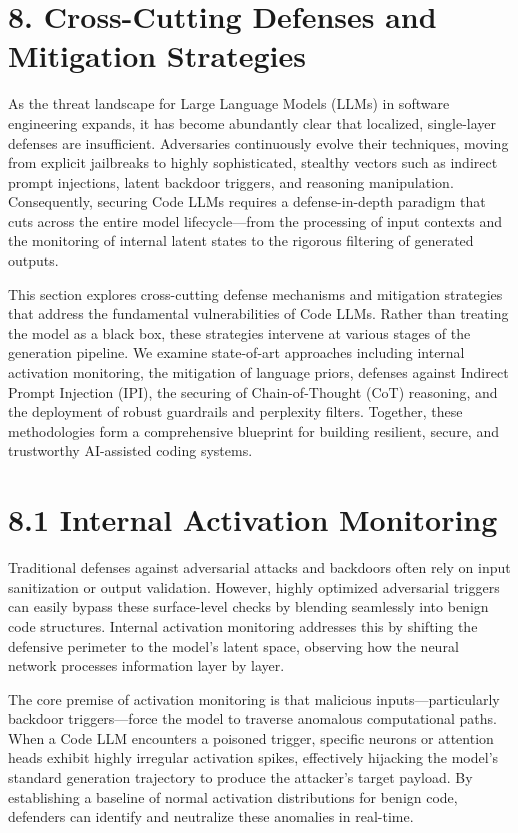 \documentclass[11pt,a4paper]{article}
\begin{document}
\section{8. Cross-Cutting Defenses and Mitigation Strategies}

As the threat landscape for Large Language Models (LLMs) in software engineering expands, it has become abundantly clear that localized, single-layer defenses are insufficient. Adversaries continuously evolve their techniques, moving from explicit jailbreaks to highly sophisticated, stealthy vectors such as indirect prompt injections, latent backdoor triggers, and reasoning manipulation. Consequently, securing Code LLMs requires a defense-in-depth paradigm that cuts across the entire model lifecycle---from the processing of input contexts and the monitoring of internal latent states to the rigorous filtering of generated outputs. 

This section explores cross-cutting defense mechanisms and mitigation strategies that address the fundamental vulnerabilities of Code LLMs. Rather than treating the model as a black box, these strategies intervene at various stages of the generation pipeline. We examine state-of-art approaches including internal activation monitoring, the mitigation of language priors, defenses against Indirect Prompt Injection (IPI), the securing of Chain-of-Thought (CoT) reasoning, and the deployment of robust guardrails and perplexity filters. Together, these methodologies form a comprehensive blueprint for building resilient, secure, and trustworthy AI-assisted coding systems.

\section{8.1 Internal Activation Monitoring}

Traditional defenses against adversarial attacks and backdoors often rely on input sanitization or output validation. However, highly optimized adversarial triggers can easily bypass these surface-level checks by blending seamlessly into benign code structures. Internal activation monitoring addresses this by shifting the defensive perimeter to the model’s latent space, observing how the neural network processes information layer by layer.

The core premise of activation monitoring is that malicious inputs---particularly backdoor triggers---force the model to traverse anomalous computational paths. When a Code LLM encounters a poisoned trigger, specific neurons or attention heads exhibit highly irregular activation spikes, effectively hijacking the model's standard generation trajectory to produce the attacker's target payload. By establishing a baseline of normal activation distributions for benign code, defenders can identify and neutralize these anomalies in real-time.
\end{document}
